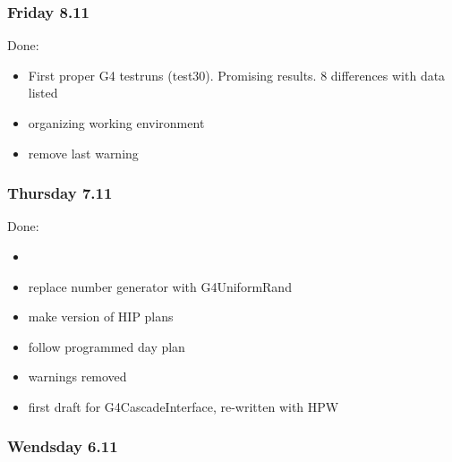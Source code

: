 \subsubsection{Friday 8.11}

Done:
\begin{itemize}
\item First proper G4 testruns (test30). Promising results. 8
  differences with data listed
\item organizing working environment
\item remove last warning
\end{itemize}

\subsubsection{Thursday 7.11}

Done:
\begin{itemize}
\item
\item replace number generator with G4UniformRand
\item make version of HIP plans
\item follow programmed day plan
\item warnings removed
\item first draft for G4CascadeInterface, re-written with HPW
\end{itemize}

\subsubsection{Wendsday 6.11}

